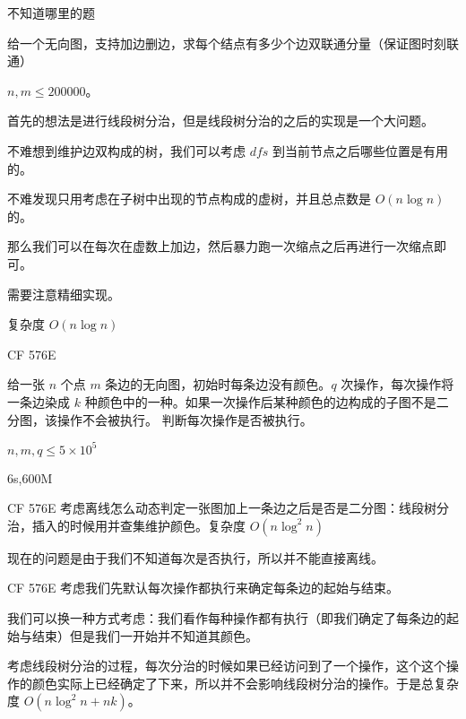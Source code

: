 \documentclass[UTF8,nofonts]{ctexbeamer}
\begin{document}
\begin{frame}{不知道哪里的题}

给一个无向图，支持加边删边，求每个结点有多少个边双联通分量（保证图时刻联通）

$n,m\le 200000$。

\end{frame}

\begin{frame}
首先的想法是进行线段树分治，但是线段树分治的之后的实现是一个大问题。
\pause

不难想到维护边双构成的树，我们可以考虑 $dfs$ 到当前节点之后哪些位置是有用的。\pause

不难发现只用考虑在子树中出现的节点构成的虚树，并且总点数是 $O(n\log n)$ 的。
\end{frame}

\begin{frame}
那么我们可以在每次在虚数上加边，然后暴力跑一次缩点之后再进行一次缩点即可。

需要注意精细实现。

复杂度 $O(n\log n)$
\end{frame}

\begin{frame}{CF 576E}

给一张 $n$ 个点 $m$ 条边的无向图，初始时每条边没有颜色。$q$ 次操作，每次操作将一条边染成 $k$ 种颜色中的一种。如果一次操作后某种颜色的边构成的子图不是二分图，该操作不会被执行。
判断每次操作是否被执行。

$n,m,q\le 5\times 10^5$

6s,600M

\end{frame}

\begin{frame}{CF 576E}
考虑离线怎么动态判定一张图加上一条边之后是否是二分图：线段树分治，插入的时候用并查集维护颜色。复杂度 $O(n\log^2 n)$

现在的问题是由于我们不知道每次是否执行，所以并不能直接离线。
\end{frame}

\begin{frame}{CF 576E}
考虑我们先默认每次操作都执行来确定每条边的起始与结束。

我们可以换一种方式考虑：我们看作每种操作都有执行（即我们确定了每条边的起始与结束）但是我们一开始并不知道其颜色。

考虑线段树分治的过程，每次分治的时候如果已经访问到了一个操作，这个这个操作的颜色实际上已经确定了下来，所以并不会影响线段树分治的操作。于是总复杂度 $O(n\log^2n + nk)$。
\end{frame}
\end{document}
